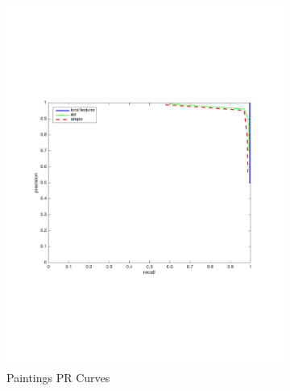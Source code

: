 \documentclass[english,12pt,a4paper,pdftex,elec,utf8, table]{aaltothesis}
\begin{document}
\begin{figure}[htb]
\begin{center}
\begin{subfigure}[b]{0.49\textwidth}
    \includegraphics[width=\textwidth]{figures/NormalizehistogramPR.pdf}
    \caption{Paintings PR Curves}
    \label{Normalizerocthinglink}
  \end{subfigure}
  \begin{subfigure}[b]{0.49\textwidth}

\end{subfigure}
\end{center}
\end{figure}
\end{document}
